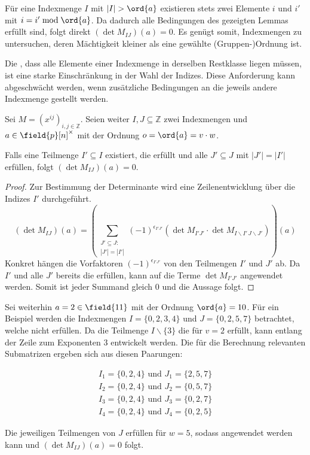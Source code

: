 {Für eine Indexmenge $I$ mit $|I| > \ord{a}$ existieren stets zwei Elemente $i$ und $i'$ mit $i = i' \bmod \ord{a}$. Da dadurch alle Bedingungen des gezeigten Lemmas erfüllt sind, folgt direkt $(\det M_{IJ})(a) = 0$. Es genügt somit, Indexmengen zu untersuchen, deren Mächtigkeit kleiner als eine gewählte (Gruppen-)Ordnung ist.

Die , dass alle Elemente einer Indexmenge in derselben Restklasse liegen müssen, ist eine starke Einschränkung in der Wahl der Indizes. Diese Anforderung kann abgeschwächt werden, wenn zusätzliche Bedingungen an die jeweils andere Indexmenge gestellt werden.

\begin{satz} \label{satz:equal-columns-subs}
    Sei $M = \left( x^{ij} \right)_{i,j \in \mathbb{Z}}$. Seien weiter $I,J \subseteq \mathbb{Z}$ zwei Indexmengen und $a \in \field{p}[n]^\times$ mit der Ordnung $o = \ord{a} = v\cdot w$.

    Falls eine Teilmenge $I' \subseteq I$ existiert, die  erfüllt und alle $J' \subseteq J$ mit $|J'| = |I'|$  erfüllen, folgt $(\det M_{IJ})(a) = 0$.
\end{satz}

\begin{proof}
    Zur Bestimmung der Determinante wird eine Zeilenentwicklung über die Indizes $I'$ durchgeführt. 
\begin{equation*}
    (\det M_{IJ})(a) = \left( \sum_{\substack{J'\subseteq J:\\|J'| = |I'|}} (-1)^{\epsilon_{I'J'}} \left( \det M_{I'J'} \cdot \det M_{I\backslash I'\,J\backslash J'} \right) \right)(a)
\end{equation*}
Konkret hängen die Vorfaktoren $(-1)^{\epsilon_{I'J'}}$ von den Teilmengen $I'$ und $J'$ ab. Da $I'$ und alle $J'$ bereits die  erfüllen, kann  auf die Terme $\det M_{I'J'}$ angewendet werden. Somit ist jeder Summand gleich $0$ und die Aussage folgt.
\end{proof}

Sei weiterhin $a = 2 \in \field{11}$ mit der Ordnung $\ord{a} = 10$. Für ein Beispiel werden die Indexmengen $I = \{0,2,3,4\}$ und $J = \{0,2,5,7\}$ betrachtet, welche  nicht erfüllen. Da die Teilmenge $I\backslash\{3\}$ die  für $v=2$ erfüllt, kann entlang der Zeile zum Exponenten $3$ entwickelt werden. Die für die Berechnung relevanten Submatrizen ergeben sich aus diesen Paarungen:

\begin{align*}
    I_1=\{0,2,4\} \text{ und } J_1=\{2,5,7\} \\
    I_2=\{0,2,4\} \text{ und } J_2=\{0,5,7\} \\
    I_3=\{0,2,4\} \text{ und } J_3=\{0,2,7\} \\
    I_4=\{0,2,4\} \text{ und } J_4=\{0,2,5\}
\end{align*}

Die jeweiligen Teilmengen von $J$ erfüllen  für $w=5$, sodass  angewendet werden kann und $(\det M_{IJ})(a) = 0$ folgt.
}

\begin{comment}
    Anstatt alle Teilmengen von $J$ einer bestimmten Kardinalität auf die Bedingung zu prüfen, kann auch das minimale $\gamma$ gesucht werden    
\end{comment}